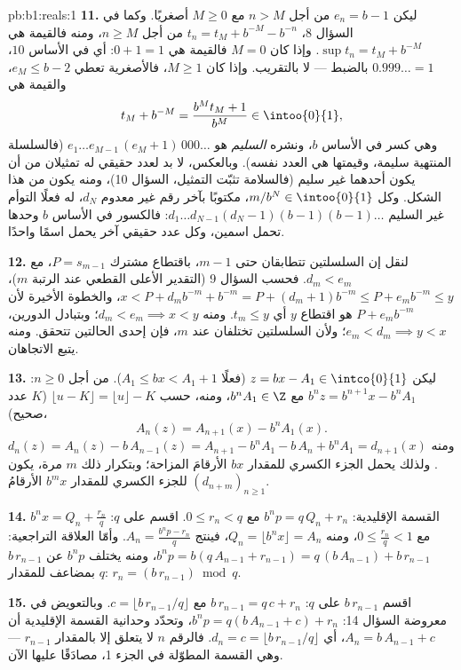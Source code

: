 \begin{solution}{pb:b1:reals:1}
\textbf{11.} ليكن $e_n = b - 1$ من أجل $n > M$ مع $M \geq 0$ أصغريًا.
وكما في السؤال 8، $t_n = t_M + b^{-M} - b^{-n}$ من أجل $n \geq M$،
ومنه فالقيمة هي $\sup t_n = t_M + b^{-M}$. وإذا كان $M = 0$ فالقيمة
هي $0 + 1 = 1$: أي في الأساس $10$، $0.999\dots = 1$ بالضبط --- لا
بالتقريب. وإذا كان $M \geq 1$، فالأصغرية تعطي $e_M \leq b - 2$،
والقيمة هي
\[
t_M + b^{-M} = \frac{b^M t_M + 1}{b^M} \in \intoo{0}{1},
\]
وهي كسر في الأساس $b$، ونشره \emph{السليم} هو $e_1 \dots
e_{M-1}\,(e_M + 1)\,000\dots$ (فالسلسلة المنتهية سليمة،
وقيمتها هي العدد نفسه). وبالعكس، لا بد لعدد حقيقي له تمثيلان
من أن يكون أحدهما غير سليم (فالسلامة تثبّت
التمثيل، السؤال 10)، ومنه يكون من هذا الشكل. وكل
$m/b^N \in \intoo{0}{1}$، مكتوبًا بآخر رقم غير معدوم $d_N$،
له فعلًا التوأم غير السليم $d_1 \dots d_{N-1}(d_N -
1)(b-1)(b-1)\dots$: فالكسور في الأساس $b$ وحدها تحمل
اسمين، وكل عدد حقيقي آخر يحمل اسمًا واحدًا.

\textbf{12.} لنقل إن السلسلتين تتطابقان حتى $m - 1$، باقتطاع
مشترك $P = s_{m-1}$، مع $d_m < e_m$. فحسب السؤال 9 (التقدير
الأعلى القطعي عند الرتبة $m$)، $x < P + d_m b^{-m} + b^{-m} = P +
(d_m + 1)b^{-m} \leq P + e_m b^{-m} \leq y$، والخطوة الأخيرة
لأن $P + e_m b^{-m}$ هو اقتطاع $y$ أي $t_m \leq y$. ومنه
$d_m < e_m \implies x < y$؛ وبتبادل الدورين، $e_m < d_m \implies
y < x$؛ ولأن السلسلتين تختلفان عند $m$، فإن إحدى الحالتين
تتحقق. ومنه يتبع الاتجاهان.

\textbf{13.} ليكن $z = bx - A_1 \in \intco{0}{1}$ (فعلًا $A_1
\leq bx < A_1 + 1$). من أجل $n \geq 0$: $b^n z = b^{n+1} x - b^n
A_1$ مع $b^n A_1 \in \Z$، ومنه، حسب $\lfloor u - K \rfloor =
\lfloor u \rfloor - K$ ($K$ عدد صحيح)،
\[
A_n(z) = A_{n+1}(x) - b^n A_1(x) .
\]
ومنه $d_n(z) = A_n(z) - b\,A_{n-1}(z) = A_{n+1} - b^n A_1 -
b\,A_n + b^n A_1 = d_{n+1}(x)$. ولذلك يحمل الجزء الكسري للمقدار $bx$
الأرقامَ المزاحة؛ وبتكرار ذلك $m$ مرة، يكون للجزء الكسري
للمقدار $b^m x$ الأرقامُ $(d_{n+m})_{n \geq 1}$.

\textbf{14.} القسمة الإقليدية: $b^n p = q\,Q_n + r_n$ مع $0
\leq r_n < q$. اقسم على $q$: $b^n x = Q_n + \frac{r_n}{q}$ مع
$0 \leq \frac{r_n}{q} < 1$، ومنه $Q_n = \lfloor b^n x \rfloor =
A_n$، فينتج $A_n = \frac{b^n p - r_n}{q}$. وأمّا العلاقة التراجعية:
$b^n p = b(q\,A_{n-1} + r_{n-1}) = q\,(b\,A_{n-1}) +
b\,r_{n-1}$، ومنه يختلف $b^n p$ عن $b\,r_{n-1}$ بمضاعف للمقدار
$q$: $r_n = (b\,r_{n-1}) \bmod q$.

\textbf{15.} اقسم $b\,r_{n-1}$ على $q$: $b\,r_{n-1} = q\,c +
r_n$ مع $c = \lfloor b\,r_{n-1}/q \rfloor$. وبالتعويض في
معروضة السؤال 14: $b^n p = q(b\,A_{n-1} + c) + r_n$،
وتحدّد وحدانية القسمة الإقليدية أن $A_n = b\,A_{n-1}
+ c$، أي $d_n = c = \lfloor b\,r_{n-1}/q \rfloor$. فالرقم
$n$ لا يتعلق إلا بالمقدار $r_{n-1}$ --- وهي  القسمة المطوّلة في الجزء
1، مصادَقًا عليها الآن.


\end{solution}
